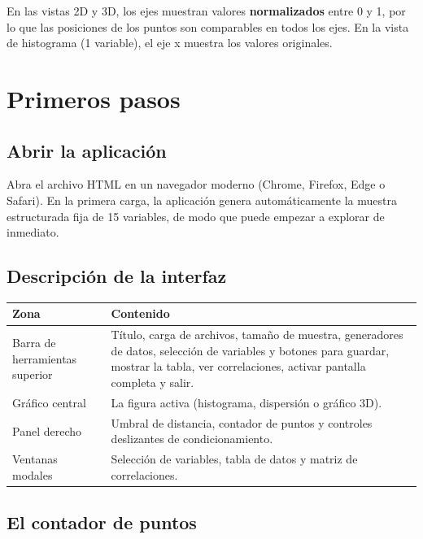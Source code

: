 \documentclass[11pt,a4paper]{article}
\begin{document}
\begin{tipbox}
En las vistas 2D y 3D, los ejes muestran valores \textbf{normalizados} entre 0 y 1, por lo que las posiciones de los puntos son comparables en todos los ejes. En la vista de histograma (1 variable), el eje x muestra los valores originales.
\end{tipbox}

\section{Primeros pasos}

\subsection{Abrir la aplicación}

Abra el archivo HTML en un navegador moderno (Chrome, Firefox, Edge o Safari). En la primera carga, la aplicación genera automáticamente la muestra estructurada fija de 15 variables, de modo que puede empezar a explorar de inmediato.

\subsection{Descripción de la interfaz}

\begin{center}
\begin{tabularx}{\textwidth}{lX}
\toprule
\textbf{Zona} & \textbf{Contenido} \\
\midrule
Barra de herramientas superior & Título, carga de archivos, tamaño de muestra, generadores de datos, selección de variables y botones para guardar, mostrar la tabla, ver correlaciones, activar pantalla completa y salir. \\
Gráfico central & La figura activa (histograma, dispersión o gráfico 3D). \\
Panel derecho & Umbral de distancia, contador de puntos y controles deslizantes de condicionamiento. \\
Ventanas modales & Selección de variables, tabla de datos y matriz de correlaciones. \\
\bottomrule
\end{tabularx}
\end{center}

\subsection{El contador de puntos}
\end{document}
